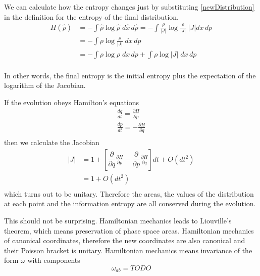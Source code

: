 \documentclass[aps,pra,10pt,twocolumn,floatfix,nofootinbib]{revtex4-1}
\begin{document}
We can calculate how the entropy changes just by substituting \ref{newDistribution} in the definition for the entropy of the final distribution.
\begin{equation}
\label{newEntropy}
\begin{aligned}
H(\hat{\rho}) &= -\int \hat{\rho} \log \hat{\rho} \; d\hat{x}\,d\hat{p}= -\int \frac{\rho}{|J|} \log \frac{\rho}{|J|} \; |J| dx \,dp \\
&= -\int \rho \log \frac{\rho}{|J|} \; dx \,dp \\
&= -\int \rho \log \rho \; dx \,dp + \int \rho \log |J| \; dx \,dp \\
\end{aligned}
\end{equation}

In other words, the final entropy is the initial entropy plus the expectation of the logarithm of the Jacobian.

If the evolution obeys Hamilton's equations
\begin{equation}
\label{Hamilton}
\begin{aligned}
\frac{dq}{dt} = \frac{\partial H}{\partial p}  \\
\frac{dp}{dt} = - \frac{\partial H}{\partial q}  \\
\end{aligned}
\end{equation}
then we calculate the Jacobian
\begin{equation}
\label{HamiltonianJacobian}
\begin{aligned}
|J| &= 1 + \left[ \dfrac{\partial}{\partial q} \frac{\partial H}{\partial p} - \dfrac{\partial}{\partial p} \frac{\partial H}{\partial q} \right] dt + O(dt^2)\\
&= 1 + O(dt^2)\\
\end{aligned}
\end{equation}
which turns out to be unitary. Therefore the areas, the values of the distribution at each point and the information entropy are all conserved during the evolution.

This should not be surprising. Hamiltonian mechanics leads to Liouville's theorem, which means preservation of phase space areas. Hamiltonian mechanics of canonical coordinates, therefore the new coordinates are also canonical and their Poisson bracket is unitary. Hamiltonian mechanics means invariance of the form $\omega$ with components
\begin{equation}
\label{singleForm}
\omega_{ab} = TODO
\end{equation}
\end{document}
